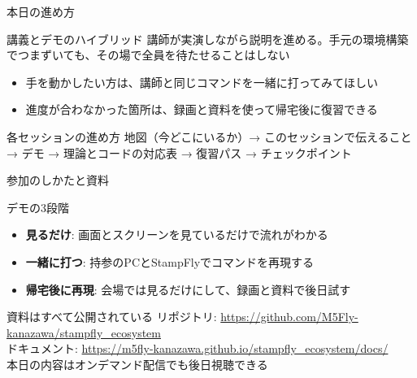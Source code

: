\begin{frame}{本日の進め方}
  \begin{block}{講義とデモのハイブリッド}
    \small 講師が実演しながら説明を進める。手元の環境構築でつまずいても、その場で全員を待たせることはしない
  \end{block}

  \vspace{0.3em}

  \begin{itemize}\small
    \item 手を動かしたい方は、講師と同じコマンドを一緒に打ってみてほしい
    \item 進度が合わなかった箇所は、録画と資料を使って帰宅後に復習できる
  \end{itemize}

  \vspace{0.3em}

  \begin{alertblock}{各セッションの進め方}
    \footnotesize 地図（今どこにいるか）→ このセッションで伝えること → デモ → 理論とコードの対応表 → 復習パス → チェックポイント
  \end{alertblock}
\end{frame}

\begin{frame}[fragile]{参加のしかたと資料}
  \begin{block}{デモの3段階}
    \begin{itemize}\small
      \item \textbf{見るだけ}: 画面とスクリーンを見ているだけで流れがわかる
      \item \textbf{一緒に打つ}: 持参のPCとStampFlyでコマンドを再現する
      \item \textbf{帰宅後に再現}: 会場では見るだけにして、録画と資料で後日試す
    \end{itemize}
  \end{block}

  \vspace{0.5em}

  \begin{exampleblock}{資料はすべて公開されている}
    \footnotesize
    リポジトリ: \url{https://github.com/M5Fly-kanazawa/stampfly_ecosystem}\\
    ドキュメント: \url{https://m5fly-kanazawa.github.io/stampfly_ecosystem/docs/}\\
    本日の内容はオンデマンド配信でも後日視聴できる
  \end{exampleblock}
\end{frame}

